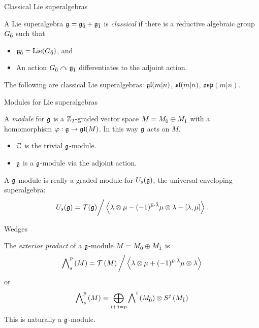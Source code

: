 \documentclass{beamer}
\begin{document}
\begin{frame}{Classical Lie superalgebras}\pause
  \begin{definition}
  A Lie superalgebra $\g = \even{\g} +\odd{\g}$ is \emph{classical} if there is a reductive algebraic group $\even{G}$ such that
  \begin{itemize}
  \item $\even{\g} = \Lie(\even{G})$, and
  \item An action $\even{G} \actson \odd{\g}$ differentiates to the adjoint action.
  \end{itemize}
  \end{definition}\pause
  \begin{example}
    The following are classical Lie superalgebras: $\gl(m|n)$, $\sl(m|n)$, $\mathfrak{osp}(m|n)$.
  \end{example}
\end{frame}

\begin{frame}{Modules for Lie superalgebras}\pause
  \begin{definition}
    A \emph{module} for $\g$ is a $\ZZ_2$-graded vector space $M = \even{M} \oplus \odd{M}$ with a homomorphism $\varphi: \g \to \gl(M)$. In this way $\g$ acts on $M$.
  \end{definition}\pause
  \begin{example}
    \begin{itemize}
    \item $\CC$ is the trivial $\g$-module.\pause
    \item $\g$ is a $\g$-module via the adjoint action.
    \end{itemize}
    
  \end{example}\pause
  A $\g$-module is really a graded module for $U_s(\g)$, the universal enveloping superalgebra:
  \[
    U_s(\g) = \mathcal{T}(\g) \bigg/ \left< \lambda \otimes \mu - (-1)^{\bar \mu \cdot \bar \lambda} \mu \otimes \lambda  - [\lambda, \mu]\right>.
  \]
\end{frame}

\begin{frame}{Wedges}\pause
  \begin{definition}
    The \emph{exterior product} of a $\g$-module $M = \even{M} \oplus \odd{M}$ is
    \[
      \superext{p}\left(M\right) = \mathcal{T}\left(M\right)\bigg/\left< \lambda \otimes \mu + (-1)^{\bar \mu \cdot \bar \lambda} \mu \otimes \lambda \right>
    \]\pause
    or
    \[
      \superext{p}\left(M\right) = \bigoplus_{i+j=p} \ext{i}\left(\even{M}\right) \otimes {S}^j\left(\odd{M}\right)
    \]\pause
 This is naturally a $\g$-module.   
  \end{definition}
\end{frame}
\end{document}
